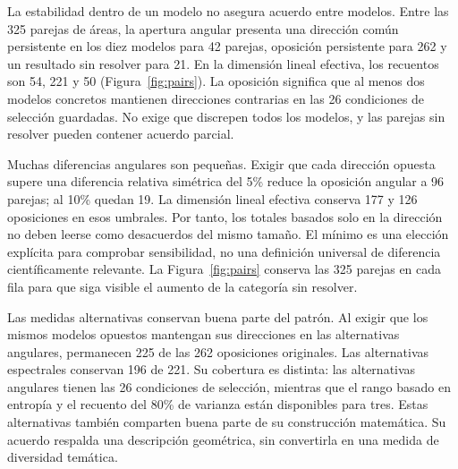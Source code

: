 \documentclass[12pt]{article}
\begin{document}
La estabilidad dentro de un modelo no asegura acuerdo entre modelos. Entre las 325 parejas de áreas, la apertura angular presenta una dirección común persistente en los diez modelos para 42 parejas, oposición persistente para 262 y un resultado sin resolver para 21. En la dimensión lineal efectiva, los recuentos son 54, 221 y 50 (Figura~\ref{fig:pairs}). La oposición significa que al menos dos modelos concretos mantienen direcciones contrarias en las 26 condiciones de selección guardadas. No exige que discrepen todos los modelos, y las parejas sin resolver pueden contener acuerdo parcial.

Muchas diferencias angulares son pequeñas. Exigir que cada dirección opuesta supere una diferencia relativa simétrica del 5\% reduce la oposición angular a 96 parejas; al 10\% quedan 19. La dimensión lineal efectiva conserva 177 y 126 oposiciones en esos umbrales. Por tanto, los totales basados solo en la dirección no deben leerse como desacuerdos del mismo tamaño. El mínimo es una elección explícita para comprobar sensibilidad, no una definición universal de diferencia científicamente relevante. La Figura~\ref{fig:pairs} conserva las 325 parejas en cada fila para que siga visible el aumento de la categoría sin resolver.


Las medidas alternativas conservan buena parte del patrón. Al exigir que los mismos modelos opuestos mantengan sus direcciones en las alternativas angulares, permanecen 225 de las 262 oposiciones originales. Las alternativas espectrales conservan 196 de 221. Su cobertura es distinta: las alternativas angulares tienen las 26 condiciones de selección, mientras que el rango basado en entropía y el recuento del 80\% de varianza están disponibles para tres. Estas alternativas también comparten buena parte de su construcción matemática. Su acuerdo respalda una descripción geométrica, sin convertirla en una medida de diversidad temática.
\end{document}
